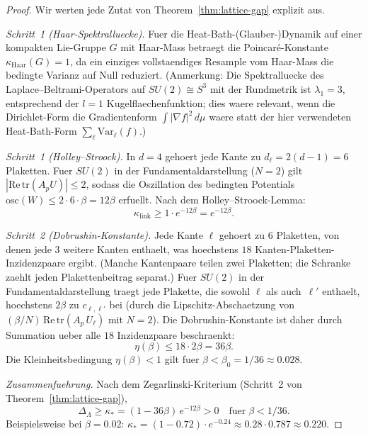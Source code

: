 \documentclass[12pt,a4paper]{article}
\theoremstyle{definition}
\theoremstyle{plain}
\theoremstyle{remark}
\begin{document}
\begin{proof}
Wir werten jede Zutat von Theorem~\ref{thm:lattice-gap} explizit aus.

\emph{Schritt~1 (Haar-Spektralluecke).} Fuer die Heat-Bath-(Glauber-)Dynamik auf einer kompakten Lie-Gruppe $G$ mit Haar-Mass betraegt die Poincar\'e-Konstante $\kappa_{\mathrm{Haar}}(G) = 1$, da ein einziges vollstaendiges Resample vom Haar-Mass die bedingte Varianz auf Null reduziert. (Anmerkung: Die Spektralluecke des Laplace--Beltrami-Operators auf $SU(2) \cong S^3$ mit der Rundmetrik ist $\lambda_1 = 3$, entsprechend der $l=1$ Kugelflaechen\-funktion; dies waere relevant, wenn die Dirichlet-Form die Gradientenform $\int |\nabla f|^2\,d\mu$ waere statt der hier verwendeten Heat-Bath-Form $\sum_\ell \mathrm{Var}_\ell(f)$.)

\emph{Schritt~1 (Holley--Stroock).} In $d=4$ gehoert jede Kante zu $d_\ell = 2(d-1) = 6$ Plaketten. Fuer $SU(2)$ in der Fundamentaldarstellung ($N=2$) gilt $|\mathrm{Re}\,\mathrm{tr}(A_p U)| \leq 2$, sodass die Oszillation des bedingten Potentials $\mathrm{osc}(W) \leq 2 \cdot 6 \cdot \beta = 12\beta$ erfuellt. Nach dem Holley--Stroock-Lemma:
\[
    \kappa_{\mathrm{link}} \geq 1 \cdot e^{-12\beta} = e^{-12\beta}.
\]

\emph{Schritt~2 (Dobrushin-Konstante).} Jede Kante $\ell$ gehoert zu $6$ Plaketten, von denen jede $3$ weitere Kanten enthaelt, was hoechstens $18$ Kanten-Plaketten-Inzidenzpaare ergibt. (Manche Kantenpaare teilen zwei Plaketten; die Schranke zaehlt jeden Plakettenbeitrag separat.) Fuer $SU(2)$ in der Fundamentaldarstellung traegt jede Plakette, die sowohl $\ell$ als auch~$\ell'$ enthaelt, hoechstens $2\beta$ zu $c_{\ell,\ell'}$ bei (durch die Lipschitz-Abschaetzung von $(\beta/N)\,\mathrm{Re}\,\mathrm{tr}(A_p\,U_\ell)$ mit $N = 2$). Die Dobrushin-Konstante ist daher durch Summation ueber alle $18$ Inzidenzpaare beschraenkt:
\[
    \eta(\beta) \leq 18 \cdot 2\beta = 36\beta.
\]
Die Kleinheitsbedingung $\eta(\beta) < 1$ gilt fuer $\beta < \beta_0 = 1/36 \approx 0.028$.

\emph{Zusammenfuehrung.} Nach dem Zegarlinski-Kriterium (Schritt~2 von Theorem~\ref{thm:lattice-gap}),
\[
    \Delta_\Lambda \geq \kappa_* = (1 - 36\beta)\,e^{-12\beta} > 0 \quad\text{fuer}\;\beta < 1/36.
\]
Beispielsweise bei $\beta = 0.02$: $\kappa_* = (1 - 0.72)\cdot e^{-0.24} \approx 0.28 \cdot 0.787 \approx 0.220$.
\end{proof}

\end{document}
